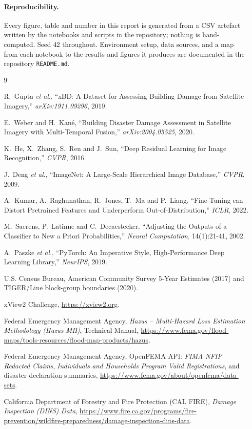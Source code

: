 \documentclass[10pt,twocolumn]{article}
\begin{document}
\paragraph{Reproducibility.} Every figure, table and number in this report is generated from a CSV
artefact written by the notebooks and scripts in the repository; nothing is hand-computed. Seed 42
throughout. Environment setup, data sources, and a map from each notebook to the results and figures
it produces are documented in the repository \texttt{README.md}.

\begin{thebibliography}{9}
\small
\setlength{\itemsep}{0pt}
\setlength{\parsep}{0pt}
\setlength{\parskip}{0pt}

R.~Gupta \emph{et al.},
``xBD: A Dataset for Assessing Building Damage from Satellite Imagery,''
\emph{arXiv:1911.09296}, 2019.

E.~Weber and H.~Kan\'e,
``Building Disaster Damage Assessment in Satellite Imagery with Multi-Temporal Fusion,''
\emph{arXiv:2004.05525}, 2020.

K.~He, X.~Zhang, S.~Ren and J.~Sun,
``Deep Residual Learning for Image Recognition,'' \emph{CVPR}, 2016.

J.~Deng \emph{et al.},
``ImageNet: A Large-Scale Hierarchical Image Database,'' \emph{CVPR}, 2009.

A.~Kumar, A.~Raghunathan, R.~Jones, T.~Ma and P.~Liang,
``Fine-Tuning can Distort Pretrained Features and Underperform Out-of-Distribution,''
\emph{ICLR}, 2022.

M.~Saerens, P.~Latinne and C.~Decaestecker,
``Adjusting the Outputs of a Classifier to New a Priori Probabilities,''
\emph{Neural Computation}, 14(1):21-41, 2002.

A.~Paszke \emph{et al.},
``PyTorch: An Imperative Style, High-Performance Deep Learning Library,'' \emph{NeurIPS}, 2019.

U.S. Census Bureau, American Community Survey 5-Year Estimates (2017) and TIGER/Line block-group
boundaries (2020).

xView2 Challenge, \url{https://xview2.org}.

Federal Emergency Management Agency, \emph{Hazus -- Multi-Hazard Loss Estimation Methodology
(Hazus-MH)}, Technical Manual, \url{https://www.fema.gov/flood-maps/tools-resources/flood-map-products/hazus}.

Federal Emergency Management Agency, OpenFEMA API: \emph{FIMA NFIP Redacted Claims},
\emph{Individuals and Households Program Valid Registrations}, and disaster declaration summaries,
\url{https://www.fema.gov/about/openfema/data-sets}.

California Department of Forestry and Fire Protection (CAL FIRE), \emph{Damage Inspection (DINS)
Data}, \url{https://www.fire.ca.gov/programs/fire-prevention/wildfire-preparedness/damage-inspection-dins-data}.

\end{thebibliography}
\end{document}
